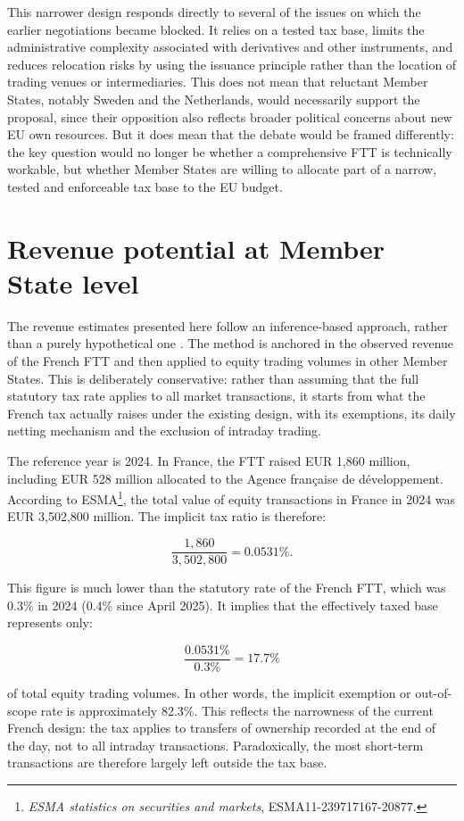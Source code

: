 \documentclass[../../main]{subfiles}
\begin{document}
This narrower design responds directly to several of the issues on which the earlier negotiations became blocked. It relies on a tested tax base, limits the administrative complexity associated with derivatives and other instruments, and reduces relocation risks by using the issuance principle rather than the location of trading venues or intermediaries. This does not mean that reluctant Member States, notably Sweden and the Netherlands, would necessarily support the proposal, since their opposition also reflects broader political concerns about new EU own resources. But it does mean that the debate would be framed differently: the key question would no longer be whether a comprehensive FTT is technically workable, but whether Member States are willing to allocate part of a narrow, tested and enforceable tax base to the EU budget.

\section{Revenue potential at Member State level}

The revenue estimates presented here follow an inference-based approach, rather than a purely hypothetical one \citep{CapelleBlancardPersaud2025}. The method is anchored in the observed revenue of the French FTT and then applied to equity trading volumes in other Member States. This is deliberately conservative: rather than assuming that the full statutory tax rate applies to all market transactions, it starts from what the French tax actually raises under the existing design, with its exemptions, its daily netting mechanism and the exclusion of intraday trading.

The reference year is 2024. In France, the FTT raised EUR 1,860 million, including EUR 528 million allocated to the Agence française de développement. According to ESMA\footnote{\textit{ESMA statistics on securities and markets}, ESMA11-239717167-20877.}, the total value of equity transactions in France in 2024 was EUR 3,502,800 million. The implicit tax ratio is therefore:

\[
\frac{1,860}{3,502,800} = 0.0531\%.
\]

This figure is much lower than the statutory rate of the French FTT, which was 0.3\% in 2024 (0.4\% since April 2025). It implies that the effectively taxed base represents only:

\[
\frac{0.0531\%}{0.3\%} = 17.7\%
\]

\noindent of total equity trading volumes. In other words, the implicit exemption or out-of-scope rate is approximately 82.3\%. This reflects the narrowness of the current French design: the tax applies to transfers of ownership recorded at the end of the day, not to all intraday transactions. Paradoxically, the most short-term transactions are therefore largely left outside the tax base.
\end{document}

